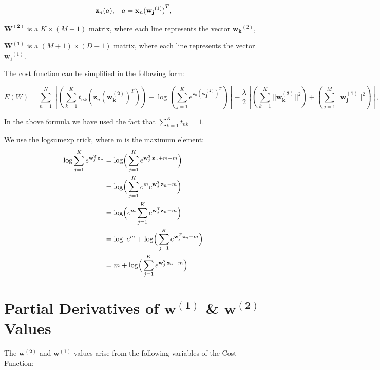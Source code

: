 \documentclass[11pt]{article}
\begin{document}
$$\mathbf z_{n}{(a)}, \hspace{3mm}  a = \mathbf x_{n} {(\mathbf{w_{j}}^{(1)})}^T,$$



\noindent $ \mathbf{W^{(2)}}$ is a $K \times (M+1)$ matrix, where each line represents the vector $\mathbf{{w}_k}^{(2)}$, 

\noindent $\mathbf {W^{(1)}}$ is a $(M+1) \times (D+1)$ matrix, where each line represents the vector $\mathbf{{w}_j}^{(1)}$.

\hfill



\noindent The cost function can be simplified in the following form:



$$
E(W) = \sum_{n=1}^N \left[ \left( \sum_{k=1}^K t_{nk} {(\mathbf{z}_n \mathbf{({w}_k^{(2)})}^T)} \right) - \log \left( \sum_{j=1}^K e^{\mathbf{z}_n \mathbf{({w}_j^{(2)})}^T} \right) \right]   -  \frac{\lambda}{2} \left[ \left( \sum_{k=1}^K ||\mathbf{w_k^{(2)}}||^2 \right) + \left( \sum_{j=1}^M ||\mathbf{w_j^{(1)}}||^2 \right) \right], 
$$
\newline

\noindent In the above formula we have used the fact that $\sum_{k=1}^K t_{nk} = 1$. 


\noindent We use the logsumexp trick, where m is the maximum element:
\begin{align} 
\log \sum_{j=1}^{K} e^{\mathbf{w}_j^T \mathbf{z}_n} &= \log \Bigr( \sum_{j=1}^{K} e^{\mathbf{w}_j^T \mathbf{z}_n +m -m}\Bigl) \\ 
&= \log \Bigr( \sum_{j=1}^{K} e^m e^{\mathbf{w}_j^T \mathbf{z}_n-m}  \Bigl) \\ 
&= \log \Bigr( e^m \sum_{j=1}^{K} e^{\mathbf{w}_j^T \mathbf{z}_n-m}  \Bigl) \\ 
&= \log \ e^m + \log \Bigr( \sum_{j=1}^{K} e^{\mathbf{w}_j^T \mathbf{z}_n-m}  \Bigl) \\ 
&= m + \log \Bigr( \sum_{j=1}^{K} e^{\mathbf{w}_j^T \mathbf{z}_n-m}  \Bigl) 
\end{align}

\section{Partial Derivatives of $\mathbf{w^{(1)}}$ \& $\mathbf{w^{(2)}}$ Values}
The $\mathbf{w^{(2)}}$ and $\mathbf{w^{(1)}}$ values arise from the following variables of the Cost Function: \\
\end{document}
